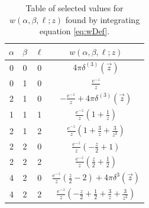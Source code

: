 \documentclass[%
 preprint,
 amsmath,amssymb,
 aps,
]{revtex4-1}
\begin{document}
\begin{table}
\begin{center}
\begin{tabular}{| c c c | c |}
\hline
$\alpha$ & $\beta$ & $\ell$ & $ w(\alpha,\beta,\ell; z)$ \\
\hline
0 & 0 & 0 & $ 4\pi \delta^{(3)}(\vec{z}) $ \\
0 & 1 & 0 & $ \frac{\displaystyle e^{-z}}{\displaystyle z} $ \\
2 & 1 & 0 & $ -\frac{\displaystyle e^{-z}}{\displaystyle z} + 4\pi \delta^{(3)}(\vec{z}) $ \\
1 & 1 & 1 &  $\frac{\displaystyle e^{-z}}{\displaystyle z} (1 + \tfrac{1}{z})  $ \\
2 & 1 & 2 & $ \frac{\displaystyle e^{-z}}{\displaystyle z} (1+ \tfrac{3}{z} + \tfrac{3}{z^2} )$ \\
2 & 2 & 0 & $ \frac{\displaystyle e^{-z}}{\displaystyle z} (-\tfrac{z}{2} + 1 ) $ \\
2 & 2 & 2 & $  \frac{\displaystyle e^{-z}}{\displaystyle z} (\tfrac{z}{2} + \tfrac{1}{2} ) $ \\
4 & 2 & 0 & $  \frac{\displaystyle e^{-z}}{\displaystyle z} (\tfrac{z}{2} - 2 ) + 4 \pi \delta^3( \vec{z} )  $ \\
4 & 2 & 2 & $  \frac{\displaystyle e^{-z}}{\displaystyle z} ( - \tfrac{z}{2} + \tfrac{1}{2} + \tfrac{3}{z} + \tfrac{3}{z^2} ) $ \\
\hline
\end{tabular}
\end{center}
\caption{\label{table:wTable} Table of selected values for $w(\alpha,\beta,\ell; z)$ found by integrating equation \eqref{eq:wDef}.}
\end{table}



\end{document}
